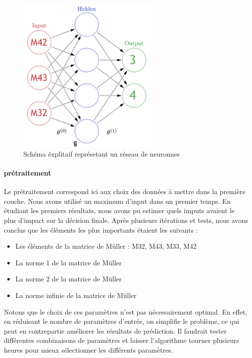 \documentclass[a4paper,10pt]{report}
\begin{document}
\begin{figure}[H]
\centering  
\caption{Schéma éxplitaif représetant un réseau de neuronnes}
\includegraphics[width=7cm]{nn_explanation.png}
\end{figure}

\paragraph{prétraitement}
Le prétraitement correspond ici aux choix des données à mettre dans la première couche. Nous avons utilisé un maximum d'input dans un premier temps. En étudiant les premiers résultats, nous avons pu estimer quels imputs avaient le plus d’impact sur la décision finale. Après plusieurs itérations et tests, nous avons conclus que les éléments les plus importants étaient les suivants :

\begin{itemize}

    \item Les éléments de la matrice de Müller : M32, M43, M33, M42

    \item La norme 1 de la matrice de Müller 
    
    \item La norme 2 de la matrice de Müller 

    \item La norme infinie de la matrice de Müller  

\end{itemize}

Notons que le choix de ces paramètres n’est pas nécessairement optimal. En effet, en réduisant le nombre de paramètres d’entrée, on simplifie le problème, ce qui peut en contrepartie améliorer les résultats de prédiction. Il faudrait tester différentes combinaisons de paramètres et laisser l’algorithme tourner plusieurs heures pour mieux sélectionner les différents paramètres.
\end{document}

